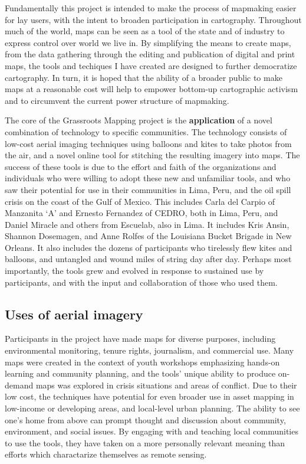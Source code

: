 \documentclass[11pt,oneside,notitlepage]{report}
\begin{document}
Fundamentally this project is intended to make the process of mapmaking easier for lay users, with the intent to broaden participation in cartography. Throughout much of the world, maps can be seen as a tool of the state and of industry to express control over world we live in. By simplifying the means to create maps, from the data gathering through the editing and publication of digital and print maps, the tools and techiques I have created are designed to further democratize cartography. In turn, it is hoped that the ability of a broader public to make maps at a reasonable cost will help to empower bottom-up cartographic activism and to circumvent the current power structure of mapmaking. 

The core of the Grassroots Mapping project is the \textbf{application} of a novel combination of technology to specific communities. The technology consists of low-cost aerial imaging techniques using balloons and kites to take photos from the air, and a novel online tool for stitching the resulting imagery into maps. The success of these tools is due to the effort and faith of the organizations and individuals who were willing to adopt these new and unfamiliar tools, and who saw their potential for use in their communities in Lima, Peru, and the oil spill crisis on the coast of the Gulf of Mexico. This includes Carla del Carpio of Manzanita `A' and Ernesto Fernandez of \ac{CEDRO}, both in Lima, Peru, and Daniel Miracle and others from Escuelab, also in Lima. It includes Kris Ansin, Shannon Dosemagen, and Anne Rolfes of the Louisiana Bucket Brigade in New Orleans. It also includes the dozens of participants who tirelessly flew kites and balloons, and untangled and wound miles of string day after day. Perhaps most importantly, the tools grew and evolved in response to sustained use by participants, and with the input and collaboration of those who used them.

\subsection{Uses of aerial imagery}

Participants in the project have made maps for diverse purposes, including environmental monitoring, tenure rights, journalism, and commercial use. Many maps were created in the context of youth workshops emphasizing hands-on learning and community planning, and the tools' unique ability to produce on-demand maps was explored in crisis situations and areas of conflict. Due to their low cost, the techniques have potential for even broader use in asset mapping in low-income or developing areas, and local-level urban planning. The ability to see one's home from above can prompt thought and discussion about community, environment, and social issues. By engaging with and teaching local communities to use the tools, they have taken on a more personally relevant meaning than efforts which charactarize themselves as remote sensing. 
 
\end{document}
